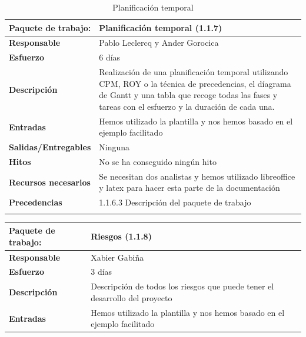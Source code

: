 \documentclass{report}
\begin{document}
\begin{center}
                \begin{longtable}{|p{6cm}|p{6cm}|}
                    \hline
                    \textbf{Paquete de trabajo:} & Planificación temporal (1.1.7)\\
                    \hline
                    \textbf{Responsable} & Pablo Leclercq y Ander Gorocica\\
                    \hline
                    \textbf{Esfuerzo} & 6 días\\
                    \hline
                    \textbf{Descripción} & Realización de una planificación temporal utilizando CPM, ROY o la técnica de precedencias, el díagrama de Gantt y una tabla que recoge todas las fases y tareas con el esfuerzo y la duración de cada una.\\
                    \hline
                    \textbf{Entradas} & Hemos utilizado la plantilla y nos hemos basado en el ejemplo facilitado\\
                    \hline
                    \textbf{Salidas/Entregables} & Ninguna\\
                    \hline
                    \textbf{Hitos} & No se ha conseguido ningún hito\\
                    \hline
                    \textbf{Recursos necesarios} & Se necesitan dos analistas y hemos utilizado libreoffice y latex para hacer esta parte de la documentación\\
                    \hline
                    \textbf{Precedencias} & 1.1.6.3 Descripción del paquete de trabajo\\
                    \hline
                    \caption{Planificación temporal}
                \end{longtable}
                \begin{longtable}{|p{6cm}|p{6cm}|}
                    \hline
                    \textbf{Paquete de trabajo:} & Riesgos (1.1.8)\\
                    \hline
                    \textbf{Responsable} & Xabier Gabiña\\
                    \hline
                    \textbf{Esfuerzo} & 3 días\\
                    \hline
                    \textbf{Descripción} & Descripción de todos los riesgos que puede tener el desarrollo del proyecto\\
                    \hline
                    \textbf{Entradas} & Hemos utilizado la plantilla y nos hemos basado en el ejemplo facilitado\\

\end{longtable}
\end{center}
\end{document}
